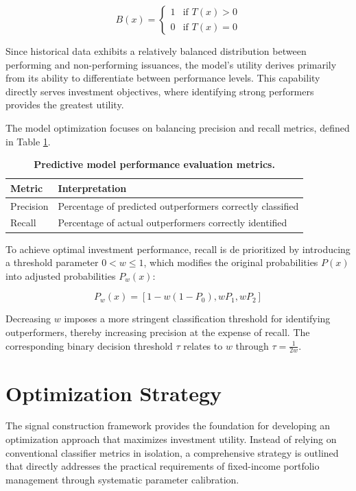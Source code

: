 \begin{equation}
B(x) =
\begin{cases}
1 & \text{if } T(x) > 0 \\
0 & \text{if } T(x) = 0
\end{cases}
\end{equation}

Since historical data exhibits a relatively balanced distribution between performing and non-performing issuances, the model's utility derives primarily from its ability to differentiate between performance levels. This capability directly serves investment objectives, where identifying strong performers provides the greatest utility.

The model optimization focuses on balancing precision and recall metrics, defined in Table \ref{tab:precision_recall_definitions}.

\begin{table}[h]
\centering
\small
\begin{tabular}{ll}\toprule
\textbf{Metric} & \textbf{Interpretation} \\\midrule
Precision & Percentage of predicted outperformers correctly classified \\
Recall & Percentage of actual outperformers correctly identified \\\bottomrule
\end{tabular}
\caption{\textbf{Predictive model performance evaluation metrics.}}
\label{tab:precision_recall_definitions}
\end{table}

To achieve optimal investment performance, recall is de prioritized by introducing a threshold parameter $0 < w \leq 1$, which modifies the original probabilities $P(x)$ into adjusted probabilities $P_w(x)$:

\begin{equation}
P_w(x) = [1 - w(1 - P_0), wP_1, wP_2]
\end{equation}

Decreasing $w$ imposes a more stringent classification threshold for identifying outperformers, thereby increasing precision at the expense of recall. The corresponding binary decision threshold $\tau$ relates to $w$ through $\tau = \frac{1}{2w}$.

\section{Optimization Strategy}

The signal construction framework provides the foundation for developing an optimization approach that maximizes investment utility. Instead of relying on conventional classifier metrics in isolation, a comprehensive strategy is outlined that directly addresses the practical requirements of fixed-income portfolio management through systematic parameter calibration.

